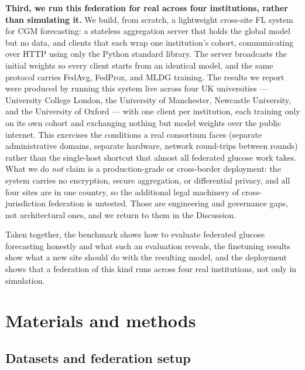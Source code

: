 \documentclass[10pt,letterpaper]{article}
\begin{document}
\textbf{Third, we run this federation for real across four institutions, rather
than simulating it.} We build, from scratch, a lightweight
cross-site FL system for CGM forecasting: a stateless aggregation server that
holds the global model but no data, and clients that each wrap one institution's
cohort, communicating over HTTP using only the Python standard library. The server
broadcasts the initial weights so every client starts from an identical model, and
the same protocol carries FedAvg, FedProx, and MLDG training. The results we
report were produced by running this system live across four UK universities ---
University College London, the University of Manchester, Newcastle University, and
the University of Oxford --- with one client per institution, each training only on
its own cohort and exchanging nothing but model weights over the public internet.
This exercises the conditions a real consortium faces (separate administrative
domains, separate hardware, network round-trips between rounds) rather than the
single-host shortcut that almost all federated glucose work takes. What we do
\emph{not} claim is a production-grade or cross-border deployment: the system
carries no encryption, secure aggregation, or differential privacy, and all four
sites are in one country, so the additional legal machinery of cross-jurisdiction
federation is untested. Those are engineering and governance gaps, not
architectural ones, and we return to them in the Discussion.

Taken together, the benchmark shows how to evaluate federated glucose forecasting
honestly and what such an evaluation reveals, the finetuning results show what a
new site should do with the resulting model, and the deployment shows that a
federation of this kind runs across four real institutions, not only in
simulation.

\section*{Materials and methods}

\subsection*{Datasets and federation setup}
\end{document}
